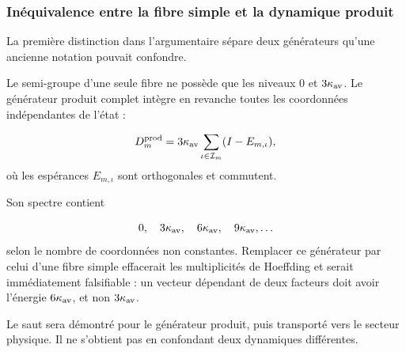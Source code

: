 \subsubsection{Inéquivalence entre la fibre simple et la dynamique produit}
La première distinction dans l’argumentaire sépare deux générateurs qu’une ancienne notation pouvait confondre.\par
Le semi-groupe d’une seule fibre ne possède que les niveaux \(0\) et \(3\kappa_{\rm av}\). Le générateur produit complet intègre en revanche toutes les coordonnées indépendantes de l’état :\par
\[
D_m^{\rm prod}
=
3\kappa_{\rm av}
\sum_{\iota\in\mathcal I_m}(I-E_{m,\iota}),
\]
où les espérances \(E_{m,\iota}\) sont orthogonales et commutent.\par
Son spectre contient\par
\[
0,\quad
3\kappa_{\rm av},\quad
6\kappa_{\rm av},\quad
9\kappa_{\rm av},\ldots
\]
selon le nombre de coordonnées non constantes. Remplacer ce générateur par celui d’une fibre simple effacerait les multiplicités de Hoeffding et serait immédiatement falsifiable : un vecteur dépendant de deux facteurs doit avoir l’énergie \(6\kappa_{\rm av}\), et non \(3\kappa_{\rm av}\).\par
Le saut sera démontré pour le générateur produit, puis transporté vers le secteur physique. Il ne s’obtient pas en confondant deux dynamiques différentes.\par
{}
